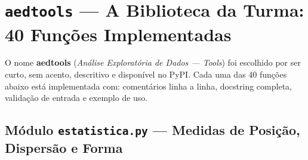 \section{\texttt{aedtools} — A Biblioteca da Turma: 40 Funções Implementadas}

O nome \textbf{aedtools} (\textit{Análise Exploratória de Dados — Tools})
foi escolhido por ser curto, sem acento, descritivo e disponível no PyPI.
Cada uma das 40 funções abaixo está implementada com:
comentários linha a linha, docstring completa, validação de entrada
e exemplo de uso.

\subsection{Módulo \texttt{estatistica.py} — Medidas de Posição, Dispersão e Forma}

